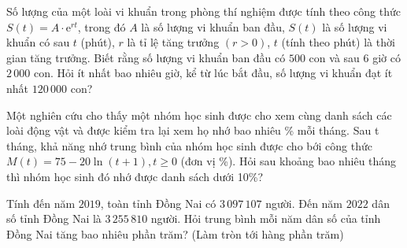 \begin{bt}%
	Số lượng của một loài vi khuẩn trong phòng thí nghiệm được tính theo công thức $S(t)=A \cdot \mathrm{e}^{rt}$, trong đó $A$ là số lượng vi khuẩn ban đầu, $S(t)$ là số lượng vi khuẩn có sau $t$ (phút), $r$ là tỉ lệ tăng trưởng $(r>0)$, $t$ (tính theo phút) là thời gian tăng trưởng. Biết rằng số lượng vi khuẩn ban đầu có $500$ con và sau $6$ giờ có $2\,000$ con. Hỏi ít nhất bao nhiêu giờ, kể từ lúc bắt đầu, số lượng vi khuẩn đạt ít nhất $120 \, 000$ con?
\end{bt}

\begin{bt}%
	Một nghiên cứu cho thấy một nhóm học sinh được cho xem cùng danh sách các loài động vật và được kiểm tra lại xem họ nhớ bao nhiêu \% mỗi tháng. Sau t tháng, khả năng nhớ trung bình của nhóm học sinh được cho bới công thức $M(t)=75-20\ln (t+1 ),t\ge 0$ (đơn vị \%). Hỏi sau khoảng bao nhiêu tháng thì nhóm học sinh đó nhớ được danh sách dưới 10\%?
\end{bt}

\begin{bt}%
	Tính đến năm $2019$, toàn tỉnh Đồng Nai có $3\,097\,107$ người. Đến năm $2022$ dân số tỉnh Đồng Nai là $3\,255\,810$ người. Hỏi trung bình mỗi năm dân số của tỉnh Đồng Nai tăng bao nhiêu phần trăm? (Làm tròn tới hàng phần trăm)
\end{bt}

